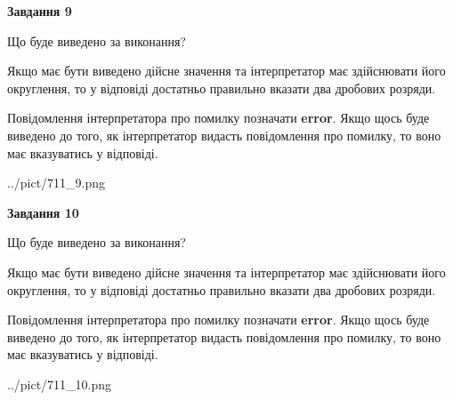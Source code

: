 \documentclass[12pt, ukrainian]{article}
\begin{document}
{\begin {Large}
{\begin {center}\textbf{Завдання 9}\end {center}}\par
Що буде виведено за виконання? \par

Якщо має бути виведено дійсне значення та інтерпретатор має здійснювати його округлення, 
то у відповіді достатньо правильно вказати два дробових розряди.

Повідомлення інтерпретатора про помилку позначати \textbf{error}.
Якщо щось буде виведено до того, як інтерпретатор видасть повідомлення про помилку, 
то воно має вказуватись у відповіді. \par

\begin{center}
	{../pict/711_9.png}
\end{center}
\newpage

{\begin {center}\textbf{Завдання 10}\end {center}}\par
Що буде виведено за виконання? \par

Якщо має бути виведено дійсне значення та інтерпретатор має здійснювати його округлення, 
то у відповіді достатньо правильно вказати два дробових розряди.

Повідомлення інтерпретатора про помилку позначати \textbf{error}.
Якщо щось буде виведено до того, як інтерпретатор видасть повідомлення про помилку, 
то воно має вказуватись у відповіді. \par

\begin{center}
	{../pict/711_10.png}
\end{center}
\newpage

\end {Large}}
\end{document}
